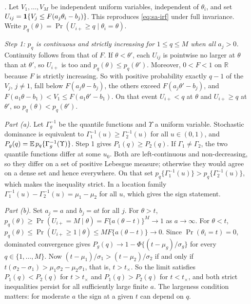 \emph{.} Let $V_1,\dots,V_M$ be independent uniform variables, independent of $\theta_i$, and set $U_{ij}=\mathbf{1}\!\left\{V_j\le F(a_j\theta_i-b_j)\right\}$. This reproduces \eqref{eq:sa-irf} under full invariance. Write $p_q(\theta)=\Pr(U_{i+}\ge q\mid\theta_i=\theta)$.

\emph{Step 1: $p_q$ is continuous and strictly increasing for $1\le q\le M$ when all $a_j>0$.} Continuity follows from that of $F$. If $\theta<\theta'$, each $U_{ij}$ is pointwise no larger at $\theta$ than at $\theta'$, so $U_{i+}$ is too and $p_q(\theta)\le p_q(\theta')$. Moreover, $0<F<1$ on $\mathbb R$ because $F$ is strictly increasing. So with positive probability exactly $q-1$ of the $V_j$, $j\ne1$, fall below $F(a_j\theta-b_j)$, the others exceed $F(a_j\theta'-b_j)$, and $F(a_1\theta-b_1)<V_1\le F(a_1\theta'-b_1)$. On that event $U_{i+}<q$ at $\theta$ and $U_{i+}\ge q$ at $\theta'$, so $p_q(\theta)<p_q(\theta')$.

\emph{Part (a).} Let $\Gamma_g^{-1}$ be the quantile functions and $\Upsilon$ a uniform variable. Stochastic dominance is equivalent to $\Gamma_1^{-1}(u)\ge \Gamma_2^{-1}(u)$ for all $u\in(0,1)$, and $P_g(q)=\mathbb{E}\,p_q\{\Gamma_g^{-1}(\Upsilon)\}$. Step 1 gives $P_1(q)\ge P_2(q)$. If $\Gamma_1\ne\Gamma_2$, the two quantile functions differ at some $u_0$. Both are left-continuous and non-decreasing, so they differ on a set of positive Lebesgue measure; otherwise they would agree on a dense set and hence everywhere. On that set $p_q\{\Gamma_1^{-1}(u)\}>p_q\{\Gamma_2^{-1}(u)\}$, which makes the inequality strict. In a location family $\Gamma_1^{-1}(u)-\Gamma_2^{-1}(u)=\mu_1-\mu_2$ for all $u$, which gives the sign statement.

\emph{Part (b).} Set $a_j=a$ and $b_j=at$ for all $j$. For $\theta>t$, $p_q(\theta)\ge\Pr(U_{i+}=M\mid\theta)=F\{a(\theta-t)\}^M\to1$ as $a\to\infty$. For $\theta<t$, $p_q(\theta)\le\Pr(U_{i+}\ge1\mid\theta)\le MF\{a(\theta-t)\}\to0$. Since $\Pr(\theta_i=t)=0$, dominated convergence gives $P_g(q)\to1-\Phi\{(t-\mu_g)/\sigma_g\}$ for every $q\in\{1,\dots,M\}$. Now $(t-\mu_1)/\sigma_1>(t-\mu_2)/\sigma_2$ if and only if $t(\sigma_2-\sigma_1)>\mu_1\sigma_2-\mu_2\sigma_1$, that is, $t>t_\times$. So the limit satisfies $P_1(q)<P_2(q)$ for $t>t_\times$ and $P_1(q)>P_2(q)$ for $t<t_\times$, and both strict inequalities persist for all sufficiently large finite $a$. The largeness condition matters: for moderate $a$ the sign at a given $t$ can depend on $q$.

